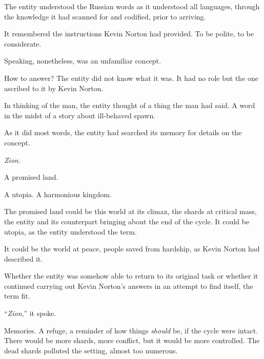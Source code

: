 The entity understood the Russian words as it understood all languages, through the knowledge it had scanned for and codified, prior to arriving.



It remembered the instructions Kevin Norton had provided.  To be polite, to be considerate.



Speaking, nonetheless, was an unfamiliar concept.



How to answer?  The entity did not know what it was.  It had no role but the one ascribed to it by Kevin Norton.



In thinking of the man, the entity thought of a thing the man had said.  A word in the midst of a story about ill-behaved spawn.



As it did most words, the entity had searched its memory for details on the concept.



\emph{Zion}.



A promised land.



A utopia.  A harmonious kingdom.



The promised land could be this world at its climax, the shards at critical mass, the entity and its counterpart bringing about the end of the cycle.  It could be utopia, as the entity understood the term.



It could be the world at peace, people saved from hardship, as Kevin Norton had described it.



Whether the entity was somehow able to return to its original task or whether it continued carrying out Kevin Norton's answers in an attempt to find itself, the term fit.



``\emph{Zion},'' it spoke.



\sectionbreak



Memories.  A refuge, a reminder of how things \emph{should} be, if the cycle were intact.  There would be more shards, more conflict, but it would be more controlled.  The dead shards polluted the setting, almost too numerous.



